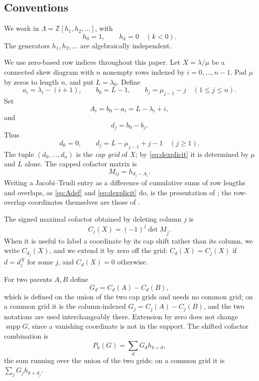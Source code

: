 \documentclass[11pt,a4paper]{amsart}
\numberwithin{equation}{section}
\theoremstyle{plain}
\theoremstyle{definition}
\DeclareMathOperator{\supp}{supp}
\newcommand{\Z}{\mathbb Z}
\newcommand{\Lam}{\Lambda}
\begin{document}
\subsection{Conventions}

We work in \(\Lam=\Z[h_1,h_2,\ldots]\),
with
\[
h_0=1,
\qquad
h_k=0\quad(k<0).
\]
The generators \(h_1,h_2,\ldots\) are algebraically independent.

We use zero-based row indices throughout this paper.  Let \(X=\lambda/\mu\)
be a connected skew diagram with \(n\) nonempty rows indexed by \(i=0,\ldots,n-1\).
Pad \(\mu\) by zeros to length \(n\), and put \(L=\lambda_0\).
Define
\[
a_i=\lambda_i-(i+1),
\qquad
b_0=L-1,
\qquad
b_j=\mu_{j-1}-j\quad(1\le j\le n).
\]
Set
\begin{equation}\label{eq:Adef}
A_i=b_0-a_i=L-\lambda_i+i,
\end{equation}
and
\begin{equation}\label{eq:ddef}
d_j=b_0-b_j.
\end{equation}
Thus
\begin{equation}\label{eq:dexplicit}
d_0=0,
\qquad
 d_j=L-\mu_{j-1}+j-1\quad(j\ge1).
\end{equation}
The tuple \((d_0,\ldots,d_n)\) is the \emph{cap grid} of \(X\); by
\eqref{eq:dexplicit} it is determined by \(\mu\) and \(L\) alone.
The capped cofactor matrix is
\begin{equation}\label{eq:capmatrix}
M_{ij}=h_{d_j-A_i}.
\end{equation}
Writing a Jacobi--Trudi entry as a difference of cumulative sums of row lengths and overlaps, as \eqref{eq:Adef} and \eqref{eq:dexplicit} do, is the presentation of \cite[(1.11)--(1.12)]{King2008SkewPositivity}; the row-overlap coordinates themselves are those of \cite[\S8.2]{Reiner2007Coincidences}.

The signed maximal cofactor obtained by deleting column \(j\) is
\begin{equation}\label{eq:cofactor}
C_j(X)=(-1)^j\det M_{\widehat j}.
\end{equation}
When it is useful to label a coordinate by its cap shift rather than its column, we write \(C_{d_j}(X)\), and we extend it by zero off the grid: \(C_d(X)=C_j(X)\) if \(d=d_j^X\) for some \(j\), and \(C_d(X)=0\) otherwise.

For two parents \(A,B\) define
\begin{equation}\label{eq:defect}
G_d=C_d(A)-C_d(B),
\end{equation}
which is defined on the union of the two cap grids and needs no common grid; on a common grid it is the column-indexed \(G_j=C_j(A)-C_j(B)\), and the two notations are used interchangeably there.  Extension by zero does not change \(\supp G\), since a vanishing coordinate is not in the support.
The shifted cofactor combination is
\begin{equation}\label{eq:Pk}
P_k(G)=\sum_d G_d h_{k+d},
\end{equation}
the sum running over the union of the two grids; on a common grid it is \(\sum_j G_j h_{k+d_j}\).
\end{document}
